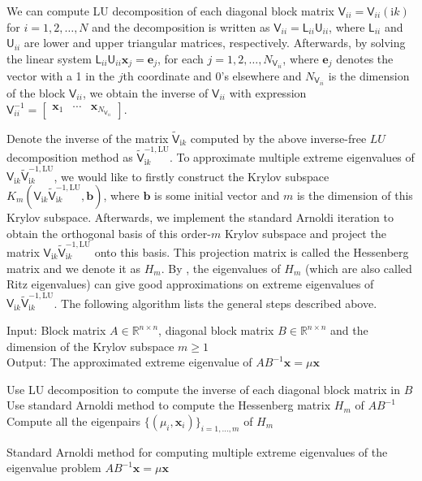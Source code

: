 We can compute LU decomposition of each diagonal block matrix $\mathsf{V}_{ii} = \mathsf{V}_{ii}(\mathrm{i}k)$ for $i = 1, 2, \dots, N$ and the decomposition is 
written as $\mathsf{V}_{ii} = \mathsf{L}_{ii}\mathsf{U}_{ii} $, where $\mathsf{L}_{ii}$ and $\mathsf{U}_{ii}$ are lower and upper triangular matrices, respectively.
Afterwards, by solving the linear system $\mathsf{L}_{ii}\mathsf{U}_{ii}\boldsymbol{x}_{j} = \boldsymbol{e}_{j}$, for each 
$j = 1, 2, \dots, N_{\mathsf{V}_{ii}}$, where $\boldsymbol{e}_{j}$ denotes the vector with a 1 in the $j$th coordinate and 0's elsewhere and 
$N_{\mathsf{V}_{ii}}$ is the dimension of the block $\mathsf{V}_{ii}$, we obtain the inverse of $\mathsf{V}_{ii}$ with expression
$\mathsf{V}_{ii}^{-1} = \begin{bmatrix}
    \boldsymbol{x}_{1} & \cdots & \boldsymbol{x}_{N_{\mathsf{V}_{ii}}}
\end{bmatrix}$.

Denote the inverse of the matrix $\tilde{\mathsf{V}}_{\mathrm{i}k}$ computed by the above inverse-free $LU$ decomposition method as 
$\tilde{\mathsf{V}}_{\mathrm{i}k}^{-1,\text{LU}}$. To approximate multiple extreme eigenvalues of 
$\mathsf{V}_{\mathrm{i}k}\tilde{\mathsf{V}}_{\mathrm{i}k}^{-1,\text{LU}}$, we would like to firstly construct the Krylov subspace  
$K_{m}(\mathsf{V}_{\mathrm{i}k}\tilde{\mathsf{V}}_{\mathrm{i}k}^{-1,\text{LU}}, \boldsymbol{b})$, where $\boldsymbol{b}$ is some 
initial vector and $m$ is the dimension of this Krylov subspace. Afterwards, we implement the standard Arnoldi iteration to obtain the orthogonal basis of 
this order-$m$ Krylov subspace and project the matrix $\mathsf{V}_{\mathrm{i}k}\tilde{\mathsf{V}}_{\mathrm{i}k}^{-1,\text{LU}}$ onto this basis. 
This projection matrix is called the Hessenberg matrix and we denote it as $H_{m}$. By \cite{saad2011numerical}, the eigenvalues of $H_{m}$ (which are also 
called Ritz eigenvalues) can give good approximations on extreme eigenvalues of $\mathsf{V}_{\mathrm{i}k}\tilde{\mathsf{V}}_{\mathrm{i}k}^{-1,\text{LU}}$.
The following algorithm lists the general steps described above.

\begin{algorithm}[H]
    \SetAlgoLined
    Input: Block matrix $A\in\mathbb{R}^{n\times n}$, diagonal block matrix $B\in\mathbb{R}^{n\times n}$ and the dimension of the Krylov subspace $m\geq 1$\\
    Output: The approximated extreme eigenvalue of $AB^{-1}\boldsymbol{x} = \mu \boldsymbol{x}$\\
    \begin{algorithmic}[1]
        \STATE Use LU decomposition to compute the inverse of each diagonal block matrix in $B$
        \STATE Use standard Arnoldi method to compute the Hessenberg matrix $H_{m}$ of $AB^{-1}$
        \STATE Compute all the eigenpairs $\{(\mu_{i}, \boldsymbol{x}_{i})\}_{i = 1, \dots, m}$ of $H_{m}$
        \end{algorithmic}
    \caption{Standard Arnoldi method for computing multiple extreme eigenvalues of the eigenvalue problem $AB^{-1}\boldsymbol{x} = \mu\boldsymbol{x}$}
    \label{Alg for arno method}
    \end{algorithm}

